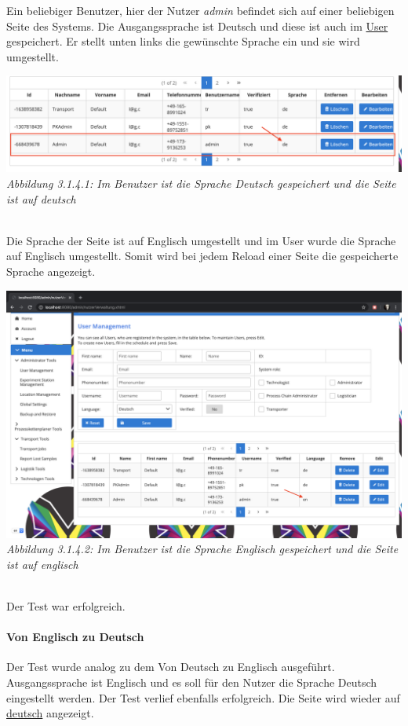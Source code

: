 \documentclass[enabledeprecatedfontcommands,fontsize=12pt,paper=a4,twoside]{scrartcl}
\begin{document}
Ein beliebiger Benutzer, hier der Nutzer \textit{admin} befindet sich auf einer beliebigen Seite des Systems. Die Ausgangssprache ist Deutsch und diese ist auch im \hyperlink{sc3.1.4.1.1}{User} gespeichert.  Er stellt unten links die gewünschte Sprache ein und sie wird umgestellt. 

\hypertarget{sc3.1.4.1.1}{
\includegraphics[width=1\textwidth]{Screenshots/31141.png}
\textit{Abbildung 3.1.4.1: Im Benutzer ist die Sprache Deutsch gespeichert und die Seite ist auf deutsch}
} \\

Die Sprache der Seite ist auf Englisch umgestellt und im User wurde die Sprache auf Englisch umgestellt. Somit wird bei jedem Reload einer Seite die gespeicherte Sprache angezeigt. 

\hypertarget{sc3.1.4.2.1}{
\includegraphics[width=1\textwidth]{Screenshots/31142.png}
\textit{Abbildung 3.1.4.2: Im Benutzer ist die Sprache Englisch gespeichert und die Seite ist auf englisch}
} \\

Der Test war erfolgreich. 

\paragraph{Von Englisch zu Deutsch}

Der Test wurde analog zu dem Von Deutsch zu Englisch ausgeführt. Ausgangssprache ist Englisch und es soll für den Nutzer die Sprache Deutsch eingestellt werden. Der Test verlief ebenfalls erfolgreich. Die Seite wird wieder auf \hyperlink{sc3.1.4.3.1}{deutsch} angezeigt.
\end{document}
